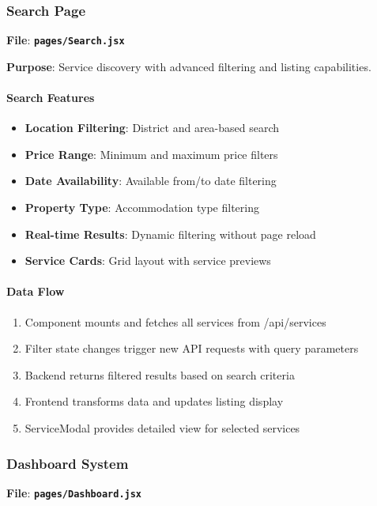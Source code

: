 \documentclass[12pt,a4paper]{article}
\newcommand{\file}[1]{\textbf{\texttt{#1}}}
\begin{document}
\subsubsection{Search Page}
\label{subsubsec:search-page}

\textbf{File}: \file{pages/Search.jsx}

\textbf{Purpose}: Service discovery with advanced filtering and listing capabilities.

\paragraph{Search Features}
\begin{itemize}
\item \textbf{Location Filtering}: District and area-based search
\item \textbf{Price Range}: Minimum and maximum price filters
\item \textbf{Date Availability}: Available from/to date filtering
\item \textbf{Property Type}: Accommodation type filtering
\item \textbf{Real-time Results}: Dynamic filtering without page reload
\item \textbf{Service Cards}: Grid layout with service previews
\end{itemize}

\paragraph{Data Flow}
\begin{enumerate}
\item Component mounts and fetches all services from /api/services
\item Filter state changes trigger new API requests with query parameters
\item Backend returns filtered results based on search criteria
\item Frontend transforms data and updates listing display
\item ServiceModal provides detailed view for selected services
\end{enumerate}

\subsubsection{Dashboard System}
\label{subsubsec:dashboard-system}

\textbf{File}: \file{pages/Dashboard.jsx}
\end{document}
